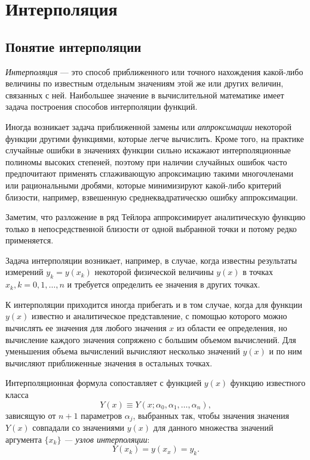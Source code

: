 \section{Интерполяция}


\subsection{Понятие интерполяции}

\emph{Интерполяция} --- это способ приближенного или точного
нахождения какой-либо величины по известным отдельным значениям этой
же или других величин, связанных с ней. Наибольшее значение в
вычислительной математике имеет задача построения способов
интерполяции функций.

Иногда возникает задача приближенной замены или
\emph{аппроксимации}\emph{ }некоторой функции
другими функциями, которые легче вычислить. Кроме того, на практике
случайные ошибки в значениях функции сильно искажают интерполяционные
полиномы высоких степеней, поэтому при наличии случайных ошибок часто
предпочитают применять сглаживающую апроксимацию такими многочленами
или рациональными дробями, которые минимизируют какой-либо критерий
близости, например, взвешенную среднеквадратическю ошибку
аппроксимации.

Заметим, что разложение в ряд Тейлора аппроксимирует аналитическую
функцию только в непосредственной близости от одной выбранной точки и
потому редко применяется.

Задача интерполяции возникает, например, в случае, когда известны
результаты измерений $y_{k}=y(x_{k})$ некоторой физической величины
$y(x)$ в точках $x_{k},k=0,1,\dots,n$ и требуется определить ее
значения в других точках.

К интерполяции приходится иногда прибегать и в том случае, когда для
функции $y(x)$ известно и аналитическое представление, с помощью
которого можно вычислять ее значения для любого значения $x$ из
области ее определения, но вычисление каждого значения сопряжено с
большим объемом вычислений. Для уменьшения объема вычислений вычисляют
несколько значений $y(x)$ и по ним вычисляют приближенные значения в
остальных точках.

Интерполяционная формула сопоставляет с функцией $y(x)$ функцию
известного класса
\[
Y(x)\equiv Y(x;\alpha_{0},\alpha_{1},\dots,\alpha_{n}),
\]
зависящую от $n+1$ параметров $\alpha_{j}$, выбранных так, чтобы
значения значения $Y(x)$ совпадали со значениями $y(x)$ для данного
множества значений аргумента $\{x_{k}\}$ \emph{--- узлов
  интерполяции}:
\[
Y(x_{k})=y(x_{x})=y_{k}.
\]


